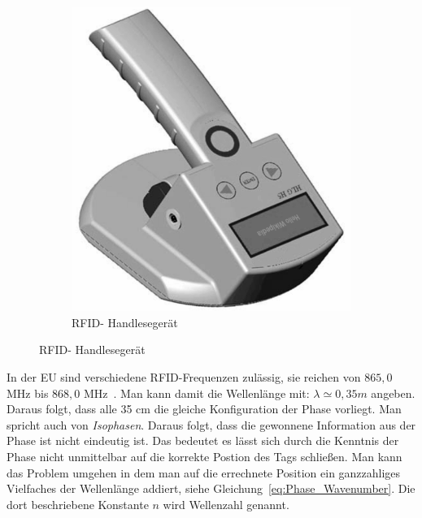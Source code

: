 \begin{figure} [h!]
%         
\qquad
%
         \begin{subfigure}[h]{0.4\textwidth}
                 \centering
                 \includegraphics[width=\textwidth]{img/RFID-Reader_gs.png}
                 \vspace{.1cm}
                 \caption{RFID- Handlesegerät }
                 \label{fig:READER}
         \end{subfigure}
\end{figure}
%
\label{sec:Measurement1}
%
%

In der EU sind verschiedene RFID-Frequenzen zulässig, sie reichen von $865,0$ MHz bis $868,0$ MHz~\cite{etsi1}. Man kann damit die Wellenlänge mit: $ \lambda\simeq0,35 m $ angeben. Daraus folgt, dass alle 35 cm die gleiche Konfiguration der Phase vorliegt. Man spricht auch von \textit{Isophasen}. Daraus folgt, dass die gewonnene Information aus der Phase ist nicht eindeutig ist. Das bedeutet es lässt sich durch die Kenntnis der Phase nicht unmittelbar auf die korrekte Postion des Tags schließen. Man kann das Problem umgehen in dem man auf die errechnete Position ein ganzzahliges Vielfaches der Wellenlänge addiert, siehe Gleichung~\ref{eq:Phase_Wavenumber}. Die dort beschriebene Konstante $n$ wird Wellenzahl genannt.\\
%

